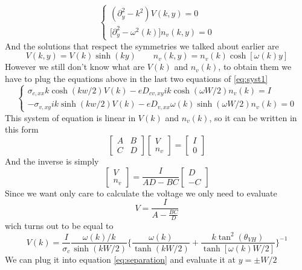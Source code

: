 \begin{equation}
    \begin{cases}
        (\partial_y^2 - k^2) V(k,y)=0\\
        \big[\partial_y^2 -\omega^2(k)\big]n_v(k,y)=0
    \end{cases}
\end{equation}
And the solutions that respect the symmetries we talked about earlier are
\begin{equation}
    V(k,y)=V(k)\sinh (ky) \quad \quad n_v(k,y)=n_v(k)\cosh [\omega(k)y]
    \label{eq:separation}
\end{equation}
However we still don't know what are $V(k)$ and $n_v(k)$, to obtain them we have to plug the equations above in the last two equations of \ref{eq:syst1}
\begin{equation}
    \begin{cases}
        \sigma_{c,xx}k\cosh(kw/2) V(k)-eD_{cv,xy}ik \cosh(\omega W/2)n_v(k)=I\\
        -\sigma_{v,xy} ik \sinh(kw/2) V(k)-eD_{v,xx}\omega(k)\sinh(\omega W/2) n_v(k)=0
    \end{cases}
\end{equation}
This system of equation is linear in $V(k)$ and $n_v(k)$, so it can be written in this form
\begin{equation}
    \begin{bmatrix}
        A&B\\
        C&D
    \end{bmatrix}
    \begin{bmatrix}
        V\\n_v
    \end{bmatrix}=
    \begin{bmatrix}
        I\\0
    \end{bmatrix}
\end{equation}
And the inverse is simply
\begin{equation}
    \begin{bmatrix}
        V\\n_v
    \end{bmatrix}=
    \frac I{AD-BC}
    \begin{bmatrix}
        D\\-C
    \end{bmatrix}
\end{equation}
Since we want only care to calculate the voltage we only need to evaluate
\[
    V=\frac{I}{A-\frac{BC}D}    
\]
wich turns out to be equal to
\begin{equation}
    V(k)=\frac I{\sigma_c}\frac{\omega(k)/k}{\sinh(kW/2)}
    \bigg\{
        \frac{\omega(k)}{\tanh(kW/2)} + \frac{k\tan^2(\theta_{VH})}{\tanh[\omega(k)W/2]}    
    \bigg\}^{-1}
    \label{eq:vk}
\end{equation}
We can plug it into equation \ref{eq:separation} and evaluate it at $y=\pm W/2$

